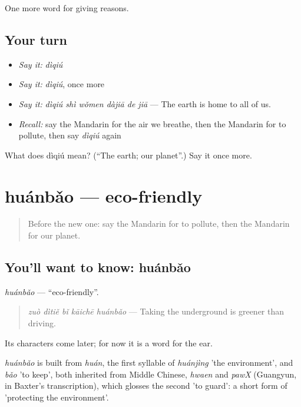 \begin{grammarlens}[title={What you've built}]
One more word for giving reasons.
\end{grammarlens}

\subsection*{Your turn}
\begin{itemize}
\raggedright
  \item \emph{Say it:} \emph{dìqiú}
  \item \emph{Say it:} \emph{dìqiú}, once more
  \item \emph{Say it:} \emph{dìqiú shì wǒmen dàjiā de jiā} — The earth is home to all of us.
  \item \emph{Recall:} say the Mandarin for the air we breathe, then the Mandarin for to pollute, then say \emph{dìqiú} again
\end{itemize}

\begin{tcolorbox}[breakable,colback=teal!4,colframe=teal!35!black,title={Before you move on}]
What does dìqiú mean? (\textquotedblleft{}The earth; our planet\textquotedblright{}.) Say it once more.
\end{tcolorbox}
\section[huánbǎo]{huánbǎo — eco-friendly}

\label{lesson:ZH-C380-huanbao}



\begin{quote}
Before the new one: say the Mandarin for to pollute, then the Mandarin for our planet.
\end{quote}

\subsection*{You'll want to know: huánbǎo}
\emph{huánbǎo} — \textquotedblleft{}eco-friendly\textquotedblright{}.

\begin{quote}
\emph{zuò dìtiě bǐ kāichē huánbǎo} — Taking the underground is greener than driving.
\end{quote}

Its characters come later; for now it is a word for the ear.

\begin{cousinweb}
\emph{huánbǎo} is built from \emph{huán}, the first syllable of \emph{huánjìng} 'the environment', and \emph{bǎo} 'to keep', both inherited from Middle Chinese, \emph{hwaen} and \emph{pawX} (Guangyun, in Baxter's transcription), which glosses the second 'to guard': a short form of 'protecting the environment'.
\end{cousinweb}

